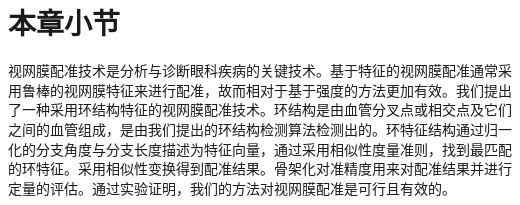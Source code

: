 \section{本章小节}
\label{}

视网膜配准技术是分析与诊断眼科疾病的关键技术。基于特征的视网膜配准通常采用鲁棒的视网膜特征来进行配准，故而相对于基于强度的方法更加有效。我们提出了一种采用环结构特征的视网膜配准技术。环结构是由血管分叉点或相交点及它们之间的血管组成，是由我们提出的环结构检测算法检测出的。环特征结构通过归一化的分支角度与分支长度描述为特征向量，通过采用相似性度量准则，找到最匹配的环特征。采用相似性变换得到配准结果。骨架化对准精度用来对配准结果并进行定量的评估。通过实验证明，我们的方法对视网膜配准是可行且有效的。
